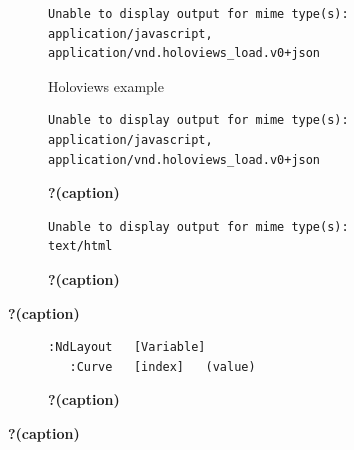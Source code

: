 \documentclass[
  letterpaper,
  DIV=11,
  numbers=noendperiod]{scrartcl}
\begin{document}
\begin{figure}

{\centering 

\begin{figure}

{\centering 

\begin{verbatim}
Unable to display output for mime type(s): application/javascript, application/vnd.holoviews_load.v0+json
\end{verbatim}

}

\caption{Holoviews example}

\end{figure}

\begin{figure}

{\centering 

\begin{verbatim}
Unable to display output for mime type(s): application/javascript, application/vnd.holoviews_load.v0+json
\end{verbatim}

}

\caption{\textbf{?(caption)}}

\end{figure}

\begin{figure}

{\centering 

\begin{verbatim}
Unable to display output for mime type(s): text/html
\end{verbatim}

}

\caption{\textbf{?(caption)}}

\end{figure}

\leavevmode{}%
\textbf{?(caption)}

\begin{figure}

{\centering 

\begin{verbatim}
:NdLayout   [Variable]
   :Curve   [index]   (value)
\end{verbatim}

}

\caption{\textbf{?(caption)}}

\end{figure}

}

\caption{\label{fig-plot}\textbf{?(caption)}}

\end{figure}
\end{document}
